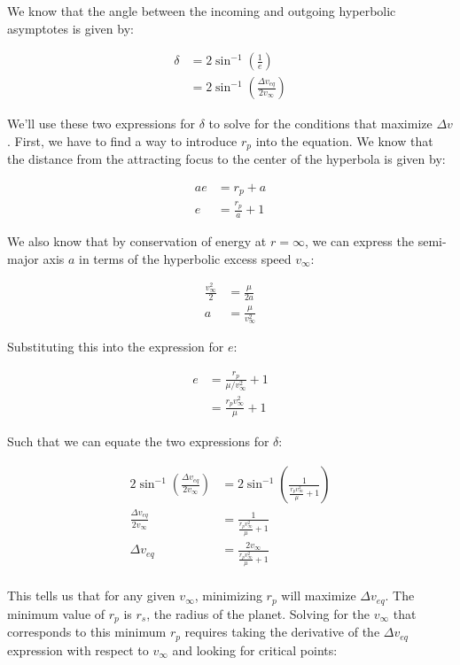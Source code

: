 We know that the angle between the incoming and outgoing hyperbolic asymptotes is given by:

\begin{align*}
    \delta &= 2 \sin^{-1} \left( \frac{1}{e} \right) \\
    &= 2 \sin^{-1} \left( \frac{\Delta v_{eq}}{2 v_\infty} \right)
\end{align*}

We'll use these two expressions for $\delta$ to solve for the conditions that maximize $\Delta v$. First, we have to find a way to introduce $r_p$ into the equation. We know that the distance from the attracting focus to the center of the hyperbola is given by:

\begin{align*}
    ae &= r_p + a \\
    e &= \frac{r_p}{a} + 1
\end{align*}

We also know that by conservation of energy at $r=\infty$, we can express the semi-major axis $a$ in terms of the hyperbolic excess speed $v_\infty$:

\begin{align*}
    \frac{v_\infty^2}{2} &= \frac{\mu}{2a} \\
    a &= \frac{\mu}{v_\infty^2}
\end{align*}

Substituting this into the expression for $e$:

\begin{align*}
    e &= \frac{r_p}{\mu/v_\infty^2} + 1 \\
    &= \frac{r_p v_\infty^2}{\mu} + 1
\end{align*}

Such that we can equate the two expressions for $\delta$:

\begin{align*}
    2 \sin^{-1} \left( \frac{\Delta v_{eq}}{2 v_\infty} \right) &= 2 \sin^{-1} \left( \frac{1}{\frac{r_p v_\infty^2}{\mu} + 1} \right) \\
    \frac{\Delta v_{eq}}{2 v_\infty} &= \frac{1}{\frac{r_p v_\infty^2}{\mu} + 1} \\
    \Delta v_{eq} &= \frac{2 v_\infty}{\frac{r_p v_\infty^2}{\mu} + 1} \\
\end{align*}

This tells us that for any given $v_\infty$, minimizing $r_p$ will maximize $\Delta v_{eq}$. The minimum value of $r_p$ is $r_s$, the radius of the planet. Solving for the $v_\infty$ that corresponds to this minimum $r_p$ requires taking the derivative of the $\Delta v_{eq}$ expression with respect to $v_\infty$ and looking for critical points:


